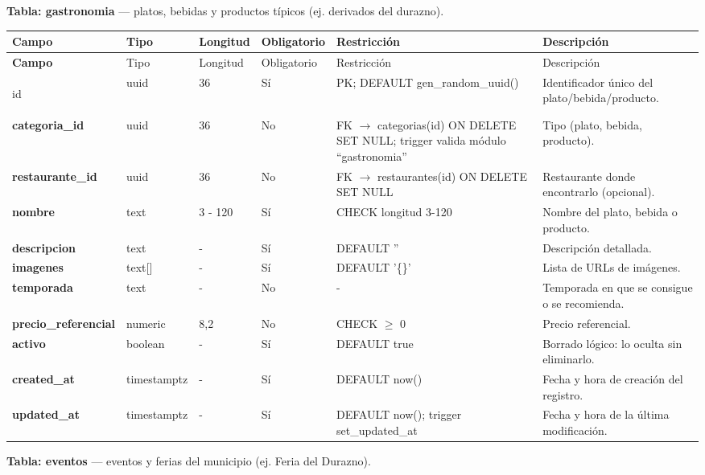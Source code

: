 \bigskip
\noindent\textbf{Tabla: gastronomia} — platos, bebidas y productos típicos (ej. derivados del durazno).

{\footnotesize
\begin{longtable}{|>{\bfseries}p{3.3cm}|p{2.6cm}|p{1.2cm}|p{1.6cm}|p{2.8cm}|p{4.0cm}|}
\hline
Campo & Tipo & Longitud & Obligatorio & Restricción & Descripción \\ \hline
\endfirsthead
\hline
Campo & Tipo & Longitud & Obligatorio & Restricción & Descripción \\ \hline
\endhead
\hline
\endfoot
\hline
\endlastfoot

id & uuid & 36 & Sí & PK; DEFAULT gen\_random\_uuid() & Identificador único del plato/bebida/producto. \\ \hline
categoria\_id & uuid & 36 & No & FK $\rightarrow$ categorias(id) ON DELETE SET NULL; trigger valida módulo ``gastronomia'' & Tipo (plato, bebida, producto). \\ \hline
restaurante\_id & uuid & 36 & No & FK $\rightarrow$ restaurantes(id) ON DELETE SET NULL & Restaurante donde encontrarlo (opcional). \\ \hline
nombre & text & 3 - 120 & Sí & CHECK longitud 3-120 & Nombre del plato, bebida o producto. \\ \hline
descripcion & text & - & Sí & DEFAULT '' & Descripción detallada. \\ \hline
imagenes & text[] & - & Sí & DEFAULT '\{\}' & Lista de URLs de imágenes. \\ \hline
temporada & text & - & No & - & Temporada en que se consigue o se recomienda. \\ \hline
precio\_referencial & numeric & 8,2 & No & CHECK $\geq$ 0 & Precio referencial. \\ \hline
activo & boolean & - & Sí & DEFAULT true & Borrado lógico: lo oculta sin eliminarlo. \\ \hline
created\_at & timestamptz & - & Sí & DEFAULT now() & Fecha y hora de creación del registro. \\ \hline
updated\_at & timestamptz & - & Sí & DEFAULT now(); trigger set\_updated\_at & Fecha y hora de la última modificación. \\ \hline
\end{longtable}
}

\bigskip
\noindent\textbf{Tabla: eventos} — eventos y ferias del municipio (ej. Feria del Durazno).

